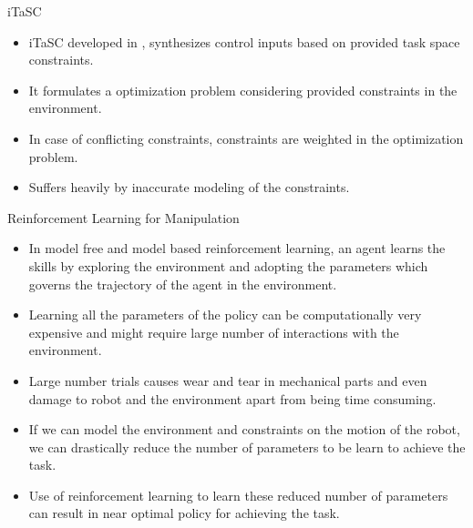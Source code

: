 \documentclass[10pt]{beamer}
\begin{document}
\begin{frame}{iTaSC}
	\begin{itemize}
		\item iTaSC developed in \cite{DeSchutter-ijrr2007, DecreBruyninckxDeSchutter2013, decre09}, synthesizes control inputs based on provided task space constraints. 
		\item It formulates a optimization problem considering provided constraints in the environment. 
		\item In case of conflicting constraints, constraints are weighted in the optimization problem.
		\item Suffers heavily by inaccurate  modeling of the constraints.  
	\end{itemize}
\end{frame}

\begin{frame}{Reinforcement Learning for Manipulation}
	\begin{itemize}
		\item In model free and model based reinforcement learning, an agent learns the skills by exploring the environment and adopting the parameters which governs the trajectory of the agent in the environment.
		\item Learning all the parameters of the policy can be computationally very expensive and might require large number of interactions with the environment.
		\item Large number trials causes wear and tear in mechanical parts and even damage to robot and the environment apart from being time consuming. 
		\item If we can model the environment and constraints on the motion of the robot, we can drastically reduce the number of parameters to be learn to achieve the task.
		\item Use of reinforcement learning to learn these reduced number of parameters can result in near optimal policy for achieving the task.
	\end{itemize}
\end{frame}
\end{document}
